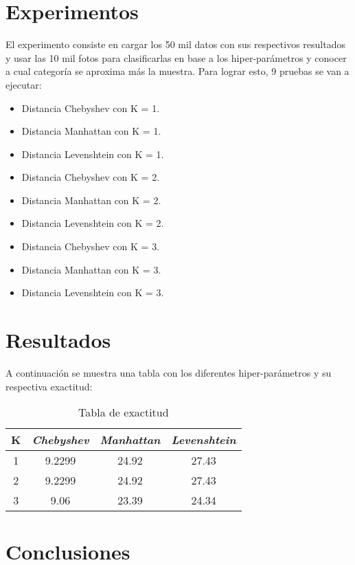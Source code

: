 \documentclass[conference]{IEEEtran}
\begin{document}
\section{Experimentos}

El experimento consiste en cargar los 50 mil datos con sus respectivos resultados y usar las 10 mil fotos para clasificarlas en base a los hiper-parámetros y conocer a cual categoría se aproxima más la muestra. Para lograr esto, 9 pruebas se van a ejecutar:

\begin{itemize}
\item Distancia Chebyshev con K = 1.
\item Distancia Manhattan con K = 1.
\item Distancia Levenshtein con K = 1.
\item Distancia Chebyshev con K = 2.
\item Distancia Manhattan con K = 2.
\item Distancia Levenshtein con K = 2.
\item Distancia Chebyshev con K = 3.
\item Distancia Manhattan con K = 3.
\item Distancia Levenshtein con K = 3.
\end{itemize}

\section{Resultados}

A continuación se muestra una tabla con los diferentes hiper-parámetros y su respectiva exactitud:

\begin{table}[htbp]
\caption{Tabla de exactitud}
\begin{center}
\begin{tabular}{|c|c|c|c|}
\hline
\textbf{K} & \textbf{\textit{Chebyshev}}& \textbf{\textit{Manhattan}}& \textbf{\textit{Levenshtein}} \\
\hline
1 & 9.2299 & 24.92 & 27.43 \\
\hline
2 & 9.2299 & 24.92 & 27.43 \\
\hline
3 & 9.06 & 23.39 & 24.34 \\
\hline
\end{tabular}
\end{center}
\end{table}

\section{Conclusiones}
\end{document}
